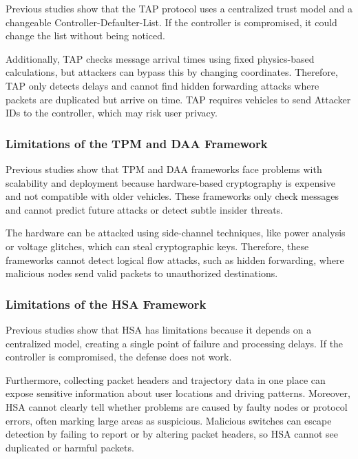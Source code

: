 \documentclass[12pt, a4paper]{report}
\begin{document}
Previous studies \cite{8616999} show that the TAP protocol uses a centralized trust model and a changeable Controller-Defaulter-List. If the controller is compromised, it could change the list without being noticed.

Additionally, TAP checks message arrival times using fixed physics-based calculations, but attackers can bypass this by changing coordinates. Therefore, TAP only detects delays and cannot find hidden forwarding attacks where packets are duplicated but arrive on time. TAP requires vehicles to send Attacker IDs to the controller, which may risk user privacy.

\subsubsection{Limitations of the TPM and DAA Framework}

Previous studies \cite{Timing_Attack} show that TPM and DAA frameworks face problems with scalability and deployment because hardware-based cryptography is expensive and not compatible with older vehicles. These frameworks only check messages and cannot predict future attacks or detect subtle insider threats.

The hardware can be attacked using side-channel techniques, like power analysis or voltage glitches, which can steal cryptographic keys. Therefore, these frameworks cannot detect logical flow attacks, such as hidden forwarding, where malicious nodes send valid packets to unauthorized destinations.

\subsubsection{Limitations of the HSA Framework}

Previous studies \cite{mohammadi2016detecting} show that HSA has limitations because it depends on a centralized model, creating a single point of failure and processing delays. If the controller is compromised, the defense does not work.

Furthermore, collecting packet headers and trajectory data in one place can expose sensitive information about user locations and driving patterns. Moreover, HSA cannot clearly tell whether problems are caused by faulty nodes or protocol errors, often marking large areas as suspicious. Malicious switches can escape detection by failing to report or by altering packet headers, so HSA cannot see duplicated or harmful packets.
\end{document}
